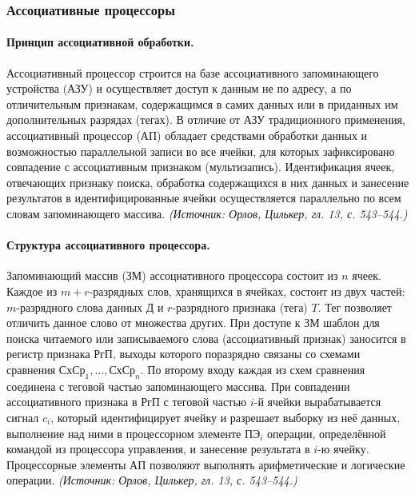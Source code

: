 \documentclass[a4paper,12pt]{article}
\begin{document}
\subsubsection{Ассоциативные процессоры}

\paragraph{Принцип ассоциативной обработки.}
Ассоциативный процессор строится на базе ассоциативного запоминающего устройства (АЗУ) и осуществляет доступ к данным не по адресу, а по отличительным признакам, содержащимся в самих данных или в приданных им дополнительных разрядах (тегах). В отличие от АЗУ традиционного применения, ассоциативный процессор (АП) обладает средствами обработки данных и возможностью параллельной записи во все ячейки, для которых зафиксировано совпадение с ассоциативным признаком (мультизапись). Идентификация ячеек, отвечающих признаку поиска, обработка содержащихся в них данных и занесение результатов в идентифицированные ячейки осуществляется параллельно по всем словам запоминающего массива.
\textit{(Источник: Орлов, Цилькер, гл. 13, с. 543--544.)}

\paragraph{Структура ассоциативного процессора.}
Запоминающий массив (ЗМ) ассоциативного процессора состоит из \(n\) ячеек. Каждое из \(m+r\)-разрядных слов, хранящихся в ячейках, состоит из двух частей: \(m\)-разрядного слова данных \(Д\) и \(r\)-разрядного признака (тега) \(T\). Тег позволяет отличить данное слово от множества других. При доступе к ЗМ шаблон для поиска читаемого или записываемого слова (ассоциативный признак) заносится в регистр признака \(РгП\), выходы которого поразрядно связаны со схемами сравнения \(СхСр_1,\ldots,СхСр_n\). По второму входу каждая из схем сравнения соединена с теговой частью запоминающего массива. При совпадении ассоциативного признака в \(РгП\) с теговой частью \(i\)-й ячейки вырабатывается сигнал \(c_i\), который идентифицирует ячейку и разрешает выборку из неё данных, выполнение над ними в процессорном элементе \(ПЭ_i\) операции, определённой командой из процессора управления, и занесение результата в \(i\)-ю ячейку. Процессорные элементы АП позволяют выполнять арифметические и логические операции.
\textit{(Источник: Орлов, Цилькер, гл. 13, с. 543--544.)}
\end{document}
